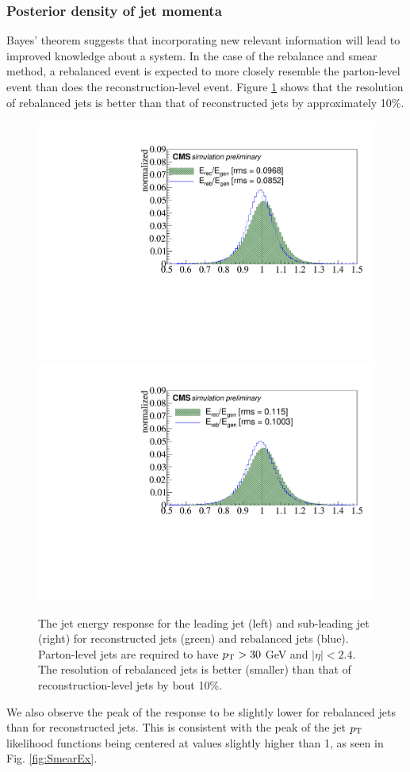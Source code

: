 \subsubsection{Posterior density of jet momenta}
Bayes' theorem suggests that incorporating new relevant information will lead to improved knowledge about a system. In the case of the rebalance and smear method, a rebalanced event is expected to more closely resemble the parton-level event than does the reconstruction-level event. Figure \ref{fig:rebareso} shows that the resolution of rebalanced jets is better than that of reconstructed jets by approximately 10\%.
\begin{figure}[h]
\centering
\includegraphics[width=0.49\linewidth]{figures/SusySearches/Ra2b2016/Jet1Resolution.pdf}
\includegraphics[width=0.49\linewidth]{figures/SusySearches/Ra2b2016/Jet2Resolution.pdf}
\caption{The jet energy response for the leading jet (left) and sub-leading jet (right) for reconstructed jets (green) and rebalanced jets (blue). Parton-level jets are required to have $p_{\text{T}}>30$ GeV and $|\eta|<2.4$. The resolution of rebalanced jets is better (smaller) than that of reconstruction-level jets by bout 10\%.}
\label{fig:rebareso}
\end{figure}
We also observe the peak of the response to be slightly lower for rebalanced jets than for reconstructed jets. This is consistent with the peak of the jet $p_{\text{T}}$ likelihood functions being centered at values slightly higher than 1, as seen in Fig. \ref{fig:SmearEx}. 
\FloatBarrier

